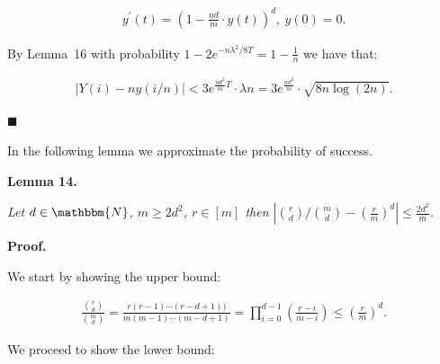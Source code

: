 \documentclass[10pt,a4paper]{article}
\begin{document}
\[\begin{gathered}
\displaystyle y^{\prime}(t)=\left(1-\frac{nd}{m}\cdot y(t)\right)^{d},\ y(0)=0.
\end{gathered}\]


By Lemma 16 with probability $1-2e^{-n\lambda^{2}/8T}=1-\frac{1}{n}$ we have that:\par


\[\begin{gathered}
\displaystyle\bigl|Y(i)-ny(i/n)\bigr|<3e^{\frac{nd^{2}}{m}T}\cdot\lambda n=3e^{\frac{nd^{2}}{m}}\cdot\sqrt{8n\log(2n)}.
\end{gathered}\]


\ensuremath{\blacksquare}\par





In the following lemma we approximate the probability of success.\par





\par\medskip\noindent\textbf{\textbf{Lemma 14}\textbf{.}}\par



\emph{Let $d\in\mathbbm{N}$, $m\geq 2d^{2}$, $r\in[m]$
then $|\binom{r}{d}/\binom{m}{d}-\left(\frac{r}{m}\right)^{d}|\leq\frac{2d^{2}}{m}$.}\par






\par\medskip\noindent\textbf{Proof.}\par



We start by showing the upper bound:\par


\[\begin{gathered}
\displaystyle\frac{\binom{r}{d}}{\binom{m}{d}}=\frac{r(r-1)\cdots(r-d+1))}{m(m-1)\cdots(m-d+1)}=\prod_{i=0}^{d-1}\left(\frac{r-i}{m-i}\right)\leq\left(\frac{r}{m}\right)^{d}.
\end{gathered}\]


We proceed to show the lower bound:\par
\end{document}

